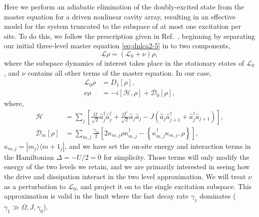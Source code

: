 Here we perform an adiabatic elimination of the doubly-excited state from the master equation for a driven nonlinear cavity array, resulting in an effective model for the system truncated to the subspace of at most one excitation per site. To do this, we follow the prescription given in Ref.~\cite{Garcia-Ripoll2009}, beginning by separating our initial three-level master equation \cref{eq:dnlca2-5} in to two components,
\begin{equation}
	\mathcal{L}\rho = (\mathcal{L}_{0} + \nu)\rho,
	\label{eq:adelim1}
\end{equation}
where the subspace dynamics of interest takes place in the stationary states of \(\mathcal{L}_{0}\), and \(\nu\) contains all other terms of the master equation. In our case,
\begin{align}
	\mathcal{L}_{0}\rho &= D_{1}\left[\rho\right], \label{eq:adelim2} \\
	\nu\rho &= -i\left[\mathcal{H}, \rho\right] + \mathcal{D}_{0}\left[\rho\right], \label{eq:adelim3}
\end{align}
where,
\begin{align}
	\mathcal{H} &= \sum_{j}\left[ \frac{\Omega}{\sqrt{2}}\hat{a}_{j}^{\dagger}\hat{a}_{j}^{\dagger} + \frac{\Omega^{*}}{\sqrt{2}}\hat{a}_{j}\hat{a}_{j} - J\left(\hat{a}_{j}\hat{a}_{j+1}^{\dagger} + \hat{a}_{j}^{\dagger}\hat{a}_{j+1}\right) \right], \label{eq:adelim4} \\
	\mathcal{D}_{m}\left[\rho\right] &= \sum_{m,j} \frac{\gamma_{m}}{2} \left[ 2\kappa_{m,j}\rho\kappa_{m,j}^{\dagger} - \left\{\kappa_{m,j}^{\dagger}\kappa_{m,j}, \rho\right\} \right], \label{eq:adelim5}
\end{align}
\(\kappa_{m,j} = |m_{j} \rangle\langle m +1_{j}|\), and we have set the on-site energy and interaction terms in the Hamiltonian \(\Delta = -U/2 = 0\) for simplicity. Those terms will only modify the energy of the two levels we retain, and we are primarily interested in seeing how the drive and dissipation interact in the two level approximation. We will treat \(\nu\) as a perturbation to \(\mathcal{L}_{0}\), and project it on to the single excitation subspace. This approximation is valid in the limit where the fast decay rate \(\gamma_{1}\) dominates (\(\gamma_{1} \gg \Omega, J, \gamma_{0}\)).

